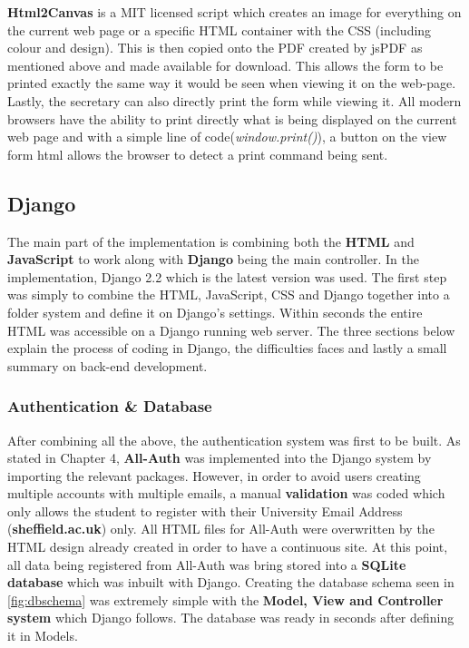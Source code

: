 \documentclass[../main.tex]{subfiles}
\begin{document}
\textbf{Html2Canvas}\cite{htmlcanvas} is a MIT licensed script which creates an image for everything on the current web page or a specific HTML container with the CSS (including colour and design). This is then copied onto the PDF created by jsPDF as mentioned above and made available for download. This allows the form to be printed exactly the same way it would be seen when viewing it on the web-page. \\[4mm]

Lastly, the secretary can also directly print the form while viewing it. All modern browsers have the ability to print directly what is being displayed on the current web page and with a simple line of code(\textit{window.print()}), a button on the view form html allows the browser to detect a print command being sent. 



\subsection{Django}
The main part of the implementation is combining both the \textbf{HTML} and \textbf{JavaScript} to work along with \textbf{Django} being the main controller. In the implementation, Django 2.2\cite{djangoLatest} which is the latest version was used. The first step was simply to combine the HTML, JavaScript, CSS and Django together into a folder system and define it on Django's settings. Within seconds the entire HTML was accessible on a Django running web server. The three sections below explain the process of coding in Django, the difficulties faces and lastly a small summary on back-end development. 

\subsubsection{Authentication \& Database}
After combining all the above, the authentication system was first to be built. As stated in Chapter 4, \textbf{All-Auth}\cite{allauth} was implemented into the Django system by importing the relevant packages. However, in order to avoid users creating multiple accounts with multiple emails, a manual \textbf{validation} was coded which only allows the student to register with their University Email Address (\textbf{sheffield.ac.uk}) only. All HTML files for All-Auth were overwritten by the HTML design already created in order to have a continuous site. At this point, all data being registered from All-Auth was bring stored into a \textbf{SQLite database} which was inbuilt with Django. Creating the database schema seen in \ref{fig:dbschema} was extremely simple with the \textbf{Model, View and Controller system} which Django follows. The database was ready in seconds after defining it in Models. \\[4mm]
\end{document}
